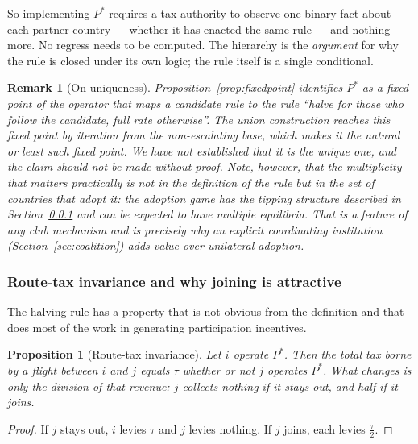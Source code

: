 \documentclass[11pt]{article}
\newtheorem{proposition}{Proposition}
\newtheorem{remark}{Remark}
\begin{document}
So implementing $P^{*}$ requires a tax authority to observe one binary fact
about each partner country --- whether it has enacted the same rule --- and
nothing more. No regress needs to be computed. The hierarchy is the
\emph{argument} for why the rule is closed under its own logic; the rule itself
is a single conditional.

\begin{remark}[On uniqueness]
Proposition~\ref{prop:fixedpoint} identifies $P^{*}$ as a fixed point of the
operator that maps a candidate rule to the rule ``halve for those who follow the
candidate, full rate otherwise''. The union construction reaches this fixed point
by iteration from the non-escalating base, which makes it the natural or least
such fixed point. We have not established that it is the unique one, and the
claim should not be made without proof. Note, however, that the multiplicity
that matters practically is not in the definition of the rule but in the
\emph{set of countries that adopt it}: the adoption game has the tipping
structure described in Section~\ref{subsec:participation} and can be expected to
have multiple equilibria. That is a feature of any club mechanism and is
precisely why an explicit coordinating institution (Section~\ref{sec:coalition})
adds value over unilateral adoption.
\end{remark}

\subsubsection{Route-tax invariance and why joining is attractive}
\label{subsec:participation}

The halving rule has a property that is not obvious from the definition and that
does most of the work in generating participation incentives.

\begin{proposition}[Route-tax invariance]
\label{prop:invariance}
Let $i$ operate $P^{*}$. Then the total tax borne by a flight between $i$ and
$j$ equals $\tau$ whether or not $j$ operates $P^{*}$. What changes is only the
\emph{division} of that revenue: $j$ collects nothing if it stays out, and half
if it joins.
\end{proposition}

\begin{proof}
If $j$ stays out, $i$ levies $\tau$ and $j$ levies nothing. If $j$ joins, each
levies $\tfrac{\tau}{2}$.
\end{proof}
\end{document}
